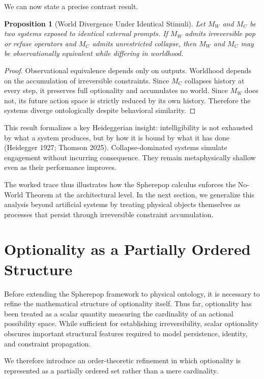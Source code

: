 \documentclass[11pt]{article}
\newtheorem{proposition}{Proposition}
\theoremstyle{remark}
\begin{document}
We can now state a precise contrast result.

\begin{proposition}[World Divergence Under Identical Stimuli]
Let $M_W$ and $M_C$ be two systems exposed to identical external prompts. If $M_W$ admits irreversible pop or refuse operators and $M_C$ admits unrestricted collapse, then $M_W$ and $M_C$ may be observationally equivalent while differing in worldhood.
\end{proposition}

\begin{proof}
Observational equivalence depends only on outputs. Worldhood depends on the accumulation of irreversible constraints. Since $M_C$ collapses history at every step, it preserves full optionality and accumulates no world. Since $M_W$ does not, its future action space is strictly reduced by its own history. Therefore the systems diverge ontologically despite behavioral similarity.
\end{proof}

This result formalizes a key Heideggerian insight: intelligibility is not exhausted by what a system produces, but by how it is bound by what it has done (Heidegger 1927; Thomson 2025). Collapse-dominated systems simulate engagement without incurring consequence. They remain metaphysically shallow even as their performance improves.

The worked trace thus illustrates how the Spherepop calculus enforces the No-World Theorem at the architectural level. In the next section, we generalize this analysis beyond artificial systems by treating physical objects themselves as processes that persist through irreversible constraint accumulation.

\section{Optionality as a Partially Ordered Structure}

Before extending the Spherepop framework to physical ontology, it is necessary to refine the mathematical structure of optionality itself. Thus far, optionality has been treated as a scalar quantity measuring the cardinality of an actional possibility space. While sufficient for establishing irreversibility, scalar optionality obscures important structural features required to model persistence, identity, and constraint propagation.

We therefore introduce an order-theoretic refinement in which optionality is represented as a partially ordered set rather than a mere cardinality.
\end{document}
